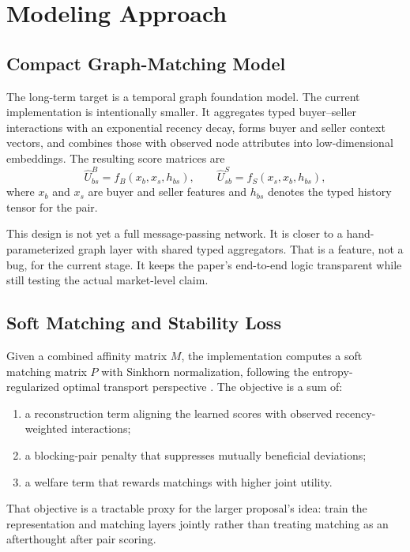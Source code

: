 \documentclass[11pt]{article}
\begin{document}
\section{Modeling Approach}

\subsection{Compact Graph-Matching Model}

The long-term target is a temporal graph foundation model. The current
implementation is intentionally smaller. It aggregates typed buyer--seller
interactions with an exponential recency decay, forms buyer and seller context
vectors, and combines those with observed node attributes into low-dimensional
embeddings. The resulting score matrices are
\[
\hat U^{B}_{bs} = f_B(x_b, x_s, h_{bs}),
\qquad
\hat U^{S}_{sb} = f_S(x_s, x_b, h_{bs}),
\]
where $x_b$ and $x_s$ are buyer and seller features and $h_{bs}$ denotes the
typed history tensor for the pair.

This design is not yet a full message-passing network. It is closer to a
hand-parameterized graph layer with shared typed aggregators. That is a feature,
not a bug, for the current stage. It keeps the paper's end-to-end logic
transparent while still testing the actual market-level claim.

\subsection{Soft Matching and Stability Loss}

Given a combined affinity matrix $M$, the implementation computes a soft
matching matrix $P$ with Sinkhorn normalization, following the
entropy-regularized optimal transport perspective \citep{cuturi2013sinkhorn}.
The objective is a sum of:
\begin{enumerate}
  \item a reconstruction term aligning the learned scores with observed
  recency-weighted interactions;
  \item a blocking-pair penalty that suppresses mutually beneficial deviations;
  \item a welfare term that rewards matchings with higher joint utility.
\end{enumerate}

That objective is a tractable proxy for the larger proposal's idea: train the
representation and matching layers jointly rather than treating matching as an
afterthought after pair scoring.
\end{document}
